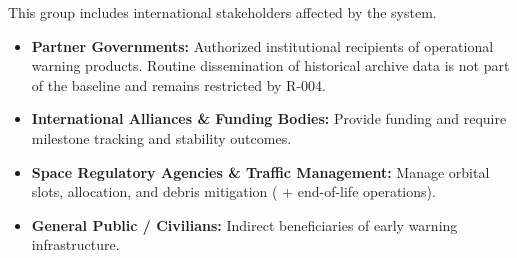 This group includes international stakeholders affected by the system.

\begin{itemize}
    \item \textbf{Partner Governments:} Authorized institutional recipients of operational warning products. Routine dissemination of historical archive data is not part of the baseline and remains restricted by R-004.
    
    \item \textbf{International Alliances \& Funding Bodies:} Provide funding and require milestone tracking and stability outcomes.
    
    \item \textbf{Space Regulatory Agencies \& Traffic Management:} Manage orbital slots,  allocation, and debris mitigation ( +  end-of-life operations).
    
    \item \textbf{General Public / Civilians:} Indirect beneficiaries of early warning infrastructure.
\end{itemize}

